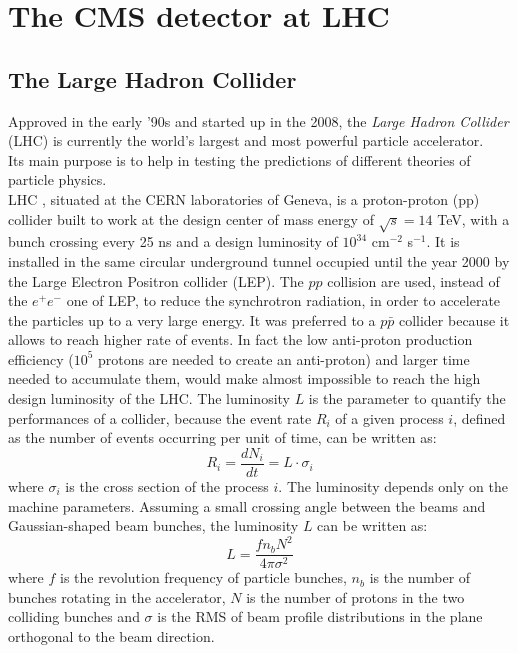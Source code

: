 \chapter{The CMS detector at LHC}
\label{Chapter2}

\section{The Large Hadron Collider}
Approved in the early '90s and started up in the 2008, the \textit{Large Hadron Collider} (LHC)  is currently the world's largest and most powerful particle accelerator. \\
Its main purpose is to help in testing the predictions of different theories of particle physics. \\
LHC \cite{LHC},  situated at the CERN laboratories of Geneva, is a proton-proton (pp) collider built to work at the design center of mass energy of $\sqrt{s} = 14$ TeV, with a bunch crossing every 25 ns and a design luminosity of $10^{34}$ cm$^{-2}$ s$^{-1}$. It is  installed in the same circular underground tunnel occupied until the year 2000 by the Large Electron Positron
collider (LEP). The $pp$ collision are used, instead of the $e^+e^-$ one of LEP, to reduce the synchrotron radiation, in order to accelerate the particles up to a very large energy. It was preferred to a $p\bar{p}$ collider because it allows to reach higher rate of events. In fact the low anti-proton production efficiency ($10^5$ protons are needed to create an anti-proton) and larger time needed to accumulate them, would make almost impossible to reach the high design luminosity of the LHC. The luminosity $L$ is the parameter to quantify the performances of a collider, because the event rate $R_i$ of a given process $i$, defined as the number of events occurring per unit of time, can be written as:
\begin{equation}
R_i = \frac{dN_i}{dt}=L\cdot \sigma_i
\end{equation}
where $\sigma_i$ is the cross section of the process $i$. The luminosity depends only on the machine parameters. Assuming a small crossing angle between the
beams and Gaussian-shaped beam bunches, the luminosity $L$ can be written as:
\begin{equation}
L=\frac{fn_bN^2}{4\pi\sigma^2}
\end{equation}
where $f$ is the revolution frequency of particle bunches, $n_b$ is the number of bunches rotating in the accelerator, $N$ is the number of protons in the two colliding bunches and $\sigma$ is the RMS of beam profile distributions in the plane orthogonal to the beam direction. \\
